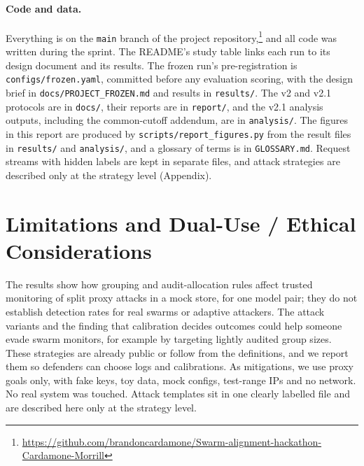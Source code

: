 \documentclass[10pt]{article}
\begin{document}
\paragraph{Code and data.} Everything is on the \texttt{main} branch of the project repository,\footnote{\url{https://github.com/brandoncardamone/Swarm-alignment-hackathon-Cardamone-Morrill}} and all code was written during the sprint. The README's study table links each run to its design document and its results. The frozen run's pre-registration is \texttt{configs/frozen.yaml}, committed before any evaluation scoring, with the design brief in \texttt{docs/PROJECT\_FROZEN.md} and results in \texttt{results/}. The v2 and v2.1 protocols are in \texttt{docs/}, their reports are in \texttt{report/}, and the v2.1 analysis outputs, including the common-cutoff addendum, are in \texttt{analysis/}. The figures in this report are produced by \texttt{scripts/report\_figures.py} from the result files in \texttt{results/} and \texttt{analysis/}, and a glossary of terms is in \texttt{GLOSSARY.md}. Request streams with hidden labels are kept in separate files, and attack strategies are described only at the strategy level (Appendix).




\appendix
\section{Limitations and Dual-Use / Ethical Considerations}
The results show how grouping and audit-allocation rules affect trusted monitoring of split proxy attacks in a mock store, for one model pair; they do not establish detection rates for real swarms or adaptive attackers. The attack variants and the finding that calibration decides outcomes could help someone evade swarm monitors, for example by targeting lightly audited group sizes. These strategies are already public \citep{brown2026} or follow from the definitions, and we report them so defenders can choose logs and calibrations. As mitigations, we use proxy goals only, with fake keys, toy data, mock configs, test-range IPs and no network. No real system was touched. Attack templates sit in one clearly labelled file and are described here only at the strategy level.
\end{document}
